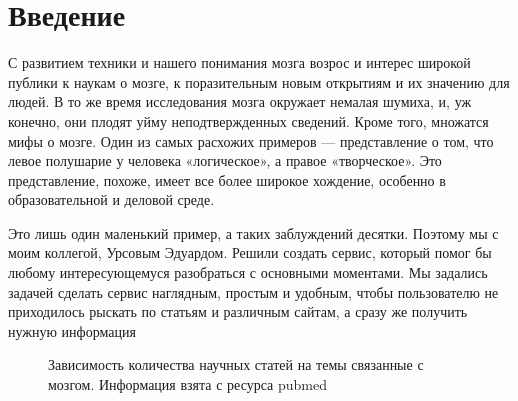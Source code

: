 \newpage
\section{Введение}

С развитием техники и нашего понимания мозга возрос и интерес широкой публики к наукам о мозге, к поразительным новым открытиям и их значению для людей. В то же время исследования мозга окружает немалая шумиха, и, уж конечно, они плодят уйму неподтвержденных сведений. Кроме того, множатся мифы о мозге. Один из самых расхожих примеров — представление о том, что левое полушарие у человека «логическое», а правое «творческое». Это представление, похоже, имеет все более широкое хождение, особенно в образовательной и деловой среде. 




Это лишь один маленький пример, а таких заблуждений десятки. Поэтому мы с моим коллегой, Урсовым Эдуардом. Решили создать сервис, который помог бы любому интересующемуся разобраться с основными моментами. Мы задались задачей сделать сервис наглядным, простым и удобным, чтобы пользователю не приходилось рыскать по статьям и различным сайтам, а сразу же получить нужную информация

\begin{figure}[h]
	\center{\texttt{[image: 1]}}
	\caption{Зависимость количества научных статей на темы связанные с мозгом. Информация взята с ресурса  pubmed }
	\label{fig:1}
\end{figure}